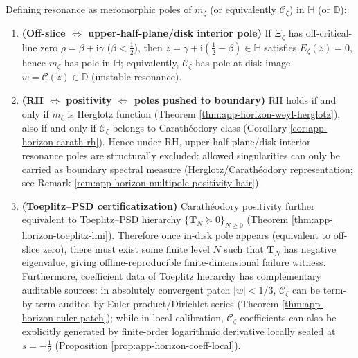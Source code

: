 \begin{proposition}\label{prop:xi-extreme-resonance-positivity}
Defining resonance as meromorphic poles of \(m_{\zeta}\) (or equivalently \(\mathscr{C}_{\zeta}\)) in \(\mathbb{H}\) (or \(\mathbb{D}\)):
\begin{enumerate}
  \item \textbf{(Off-slice \texorpdfstring{$\Longleftrightarrow$}{<->} upper-half-plane/disk interior pole)}
  If \(\Xi_{\zeta}\) has off-critical-line zero \(\rho=\beta+\mathrm{i}\gamma\) (\(\beta<\tfrac12\)), then
  \(z=\gamma+\mathrm{i}(\tfrac12-\beta)\in\mathbb{H}\) satisfies \(E_{\zeta}(z)=0\), hence \(m_{\zeta}\) has pole in \(\mathbb{H}\); equivalently, \(\mathscr{C}_{\zeta}\) has pole at disk image \(w=\mathcal{C}(z)\in\mathbb{D}\) (unstable resonance).
  \item \textbf{(RH \texorpdfstring{$\Longleftrightarrow$}{<->} positivity \texorpdfstring{$\Longleftrightarrow$}{<->} poles pushed to boundary)}
  RH holds if and only if \(m_{\zeta}\) is Herglotz function (Theorem \ref{thm:app-horizon-weyl-herglotz}), also if and only if \(\mathscr{C}_{\zeta}\) belongs to Carathéodory class (Corollary \ref{cor:app-horizon-carath-rh}).
  Hence under RH, upper-half-plane/disk interior resonance poles are structurally excluded: allowed singularities can only be carried as boundary spectral measure (Herglotz/Carathéodory representation; see Remark \ref{rem:app-horizon-multipole-positivity-hair}).
  \item \textbf{(Toeplitz--PSD certificatization)}
  Carathéodory positivity further equivalent to Toeplitz--PSD hierarchy \(\{\mathbf{T}_N\succeq 0\}_{N\ge 0}\) (Theorem \ref{thm:app-horizon-toeplitz-lmi}).
  Therefore once in-disk pole appears (equivalent to off-slice zero), there must exist some finite level \(N\) such that \(\mathbf{T}_N\) has negative eigenvalue, giving offline-reproducible finite-dimensional failure witness.
  Furthermore, coefficient data of Toeplitz hierarchy has complementary auditable sources: in absolutely convergent patch \(|w|<1/3\), \(\mathscr{C}_{\zeta}\) can be term-by-term audited by Euler product/Dirichlet series (Theorem \ref{thm:app-horizon-euler-patch}); while in local calibration, \(\mathscr{C}_{\zeta}\) coefficients can also be explicitly generated by finite-order logarithmic derivative locally sealed at \(s=-\tfrac12\) (Proposition \ref{prop:app-horizon-coeff-local}).
\end{enumerate}
\end{proposition}

